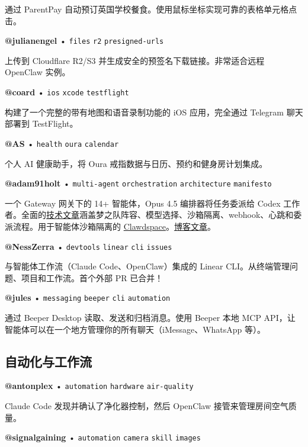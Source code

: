 通过 ParentPay 自动预订英国学校餐食。使用鼠标坐标实现可靠的表格单元格点击。

\textbf{@julianengel} • \texttt{files} \texttt{r2} \texttt{presigned-urls}

上传到 Cloudflare R2/S3 并生成安全的预签名下载链接。非常适合远程 OpenClaw 实例。

\textbf{@coard} • \texttt{ios} \texttt{xcode} \texttt{testflight}

构建了一个完整的带有地图和语音录制功能的 iOS 应用，完全通过 Telegram 聊天部署到 TestFlight。


\textbf{@AS} • \texttt{health} \texttt{oura} \texttt{calendar}

个人 AI 健康助手，将 Oura 戒指数据与日历、预约和健身房计划集成。

\textbf{@adam91holt} • \texttt{multi-agent} \texttt{orchestration} \texttt{architecture} \texttt{manifesto}

一个 Gateway 网关下的 14+ 智能体，Opus 4.5 编排器将任务委派给 Codex 工作者。全面的\href{https://github.com/adam91holt/orchestrated-ai-articles}{技术文章}涵盖梦之队阵容、模型选择、沙箱隔离、webhook、心跳和委派流程。用于智能体沙箱隔离的 \href{https://github.com/adam91holt/clawdspace}{Clawdspace}。\href{https://adams-ai-journey.ghost.io/2026-the-year-of-the-orchestrator/}{博客文章}。

\textbf{@NessZerra} • \texttt{devtools} \texttt{linear} \texttt{cli} \texttt{issues}

与智能体工作流（Claude Code、OpenClaw）集成的 Linear CLI。从终端管理问题、项目和工作流。首个外部 PR 已合并！

\textbf{@jules} • \texttt{messaging} \texttt{beeper} \texttt{cli} \texttt{automation}

通过 Beeper Desktop 读取、发送和归档消息。使用 Beeper 本地 MCP API，让智能体可以在一个地方管理你的所有聊天（iMessage、WhatsApp 等）。


\subsection{自动化与工作流}



\textbf{@antonplex} • \texttt{automation} \texttt{hardware} \texttt{air-quality}

Claude Code 发现并确认了净化器控制，然后 OpenClaw 接管来管理房间空气质量。


\textbf{@signalgaining} • \texttt{automation} \texttt{camera} \texttt{skill} \texttt{images}

